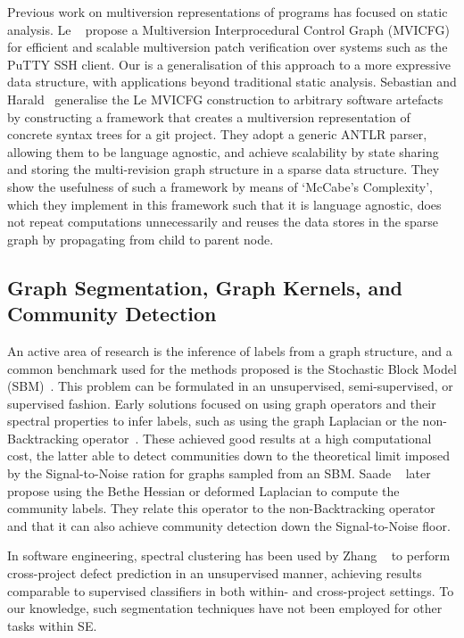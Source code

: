 Previous work on multiversion representations of programs has focused on static
analysis. Le \etal~\cite{Le2014} propose a Multiversion Interprocedural Control
Graph (MVICFG) for efficient and scalable multiversion patch verification over
systems such as the PuTTY SSH client. Our \deltaPDG is a generalisation of this
approach to a more expressive data structure, with applications beyond
traditional static analysis. Sebastian and Harald~\cite{Sebastian2018}
generalise the Le \etal MVICFG construction to arbitrary software artefacts by
constructing a framework that creates a multiversion representation of concrete
syntax trees for a git project. They adopt a generic ANTLR parser, allowing them
to be language agnostic, and achieve scalability by state sharing and storing
the multi-revision graph structure in a sparse data structure. They show the
usefulness of such a framework by means of `McCabe’s Complexity', which they
implement in this framework such that it is language agnostic, does not repeat
computations unnecessarily and reuses the data stores in the sparse graph by
propagating from child to parent node.

\subsection{Graph Segmentation, Graph Kernels, and Community Detection}
\label{chapter:literature:sec:flexeme_rel_work:graph_seg}


An active area of research is the inference of labels from a graph structure,
and a common benchmark used for the methods proposed is the Stochastic Block
Model (SBM)~\cite{HOLLAND1983}. This problem can be formulated in an
unsupervised, semi-supervised, or supervised fashion. Early solutions focused on
using graph operators and their spectral properties to infer labels, such as
using the graph Laplacian or the non-Backtracking operator~\cite{Krzakala2013}.
These achieved good results at a high computational cost, the latter able to
detect communities down to the theoretical limit imposed by the Signal-to-Noise
ration for graphs sampled from an SBM. Saade \etal~\cite{Saade2014} later
propose using the Bethe Hessian or deformed Laplacian to compute the community
labels. They relate this operator to the non-Backtracking operator and that it
can also achieve community detection down the Signal-to-Noise floor.

In software engineering, spectral clustering has been used by Zhang
\etal~\cite{Zhang2016} to perform cross-project defect prediction in an
unsupervised manner, achieving results comparable to supervised classifiers in
both within- and cross-project settings. To our knowledge, such segmentation
techniques have not been employed for other tasks within SE.


